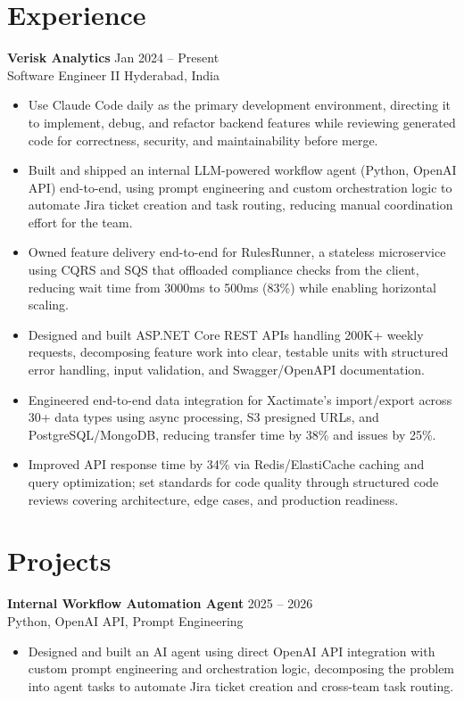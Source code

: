 \documentclass[10pt,letterpaper]{article}
\newcommand{\resumeSubheading}[4]{%
  \textbf{#1} \hfill #2 \\
  #3 \hfill #4 \\
}
\begin{document}
\section*{Experience}
\resumeSubheading{Verisk Analytics}{Jan 2024 -- Present}{Software Engineer II}{Hyderabad, India}
\begin{itemize}
    \item Use Claude Code daily as the primary development environment, directing it to implement, debug, and refactor backend features while reviewing generated code for correctness, security, and maintainability before merge.
    \item Built and shipped an internal LLM-powered workflow agent (Python, OpenAI API) end-to-end, using prompt engineering and custom orchestration logic to automate Jira ticket creation and task routing, reducing manual coordination effort for the team.
    \item Owned feature delivery end-to-end for RulesRunner, a stateless microservice using CQRS and SQS that offloaded compliance checks from the client, reducing wait time from 3000ms to 500ms (83\%) while enabling horizontal scaling.
    \item Designed and built ASP.NET Core REST APIs handling 200K+ weekly requests, decomposing feature work into clear, testable units with structured error handling, input validation, and Swagger/OpenAPI documentation.
    \item Engineered end-to-end data integration for Xactimate's import/export across 30+ data types using async processing, S3 presigned URLs, and PostgreSQL/MongoDB, reducing transfer time by 38\% and issues by 25\%.
    \item Improved API response time by 34\% via Redis/ElastiCache caching and query optimization; set standards for code quality through structured code reviews covering architecture, edge cases, and production readiness.
\end{itemize}

\section*{Projects}
\resumeSubheading{Internal Workflow Automation Agent}{2025 -- 2026}{}{Python, OpenAI API, Prompt Engineering}
\begin{itemize}
    \item Designed and built an AI agent using direct OpenAI API integration with custom prompt engineering and orchestration logic, decomposing the problem into agent tasks to automate Jira ticket creation and cross-team task routing.
\end{itemize}
\end{document}
